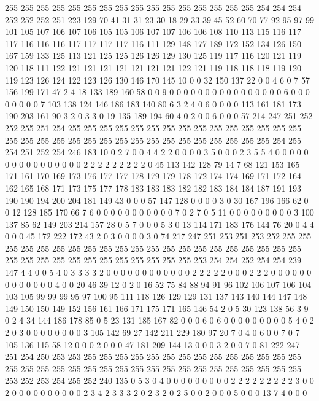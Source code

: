 255 255 255 255 255 255 255 255 255 255 255 255 255 255 255 255 254 254 254 252
252 252 251 223 129 70 41 31 31 23 30 18 29 33 39 45 52 60 70 77
92 95 97 99 101 105 107 106 107 106 105 105 106 107 107 106 106 108 110 113
115 116 117 117 116 116 116 117 117 117 117 116 111 129 148 177 189 172 152 134
126 150 167 159 133 125 113 121 125 125 126 126 129 130 125 119 117 116 120 121
119 120 118 111 122 121 121 121 121 121 121 121 122 121 119 118 118 118 119 120
119 123 126 124 122 123 126 130 146 170 145 10 0 0 32 150 137 22 0 0
4 6 0 7 57 156 199 171 47 2 4 18 133 189 160 58 0 0 9 0
0 0 0 0 0 0 0 0 0 0 0 0 0 0 0 6 0 0 0 0
0 0 0 0 7 103 138 124 146 186 183 140 80 6 3 2 4 0 6 0
0 0 0 113 161 181 173 190 203 161 90 3 2 0 3 3 0 19 135 189
194 60 4 0 2 0 0 6 0 0 0 57 214 247 251 252 252 255 251 254
255 255 255 255 255 255 255 255 255 255 255 255 255 255 255 255 255 255 255 255
255 255 255 255 255 255 255 255 255 255 255 255 254 255 254 251 252 254 246 183
10 0 2 7 0 0 4 4 2 2 0 0 0 0 3 5 0 0 0 2
3 5 5 4 0 0 0 0 0 0 0 0 0 0 0 0 0 0 0 0
2 2 2 2 2 2 2 2 2 0 45 113 142 128 79 14 7 68 121 153
165 171 161 170 169 173 176 177 177 178 179 179 178 172 174 174 169 171 172 164
162 165 168 171 173 175 177 178 183 183 183 182 182 183 184 184 187 191 193 190
190 194 200 204 181 149 43 0 0 0 57 147 128 0 0 0 0 3 0 30
167 196 166 62 0 0 12 128 185 170 66 7 6 0 0 0 0 0 0 0
0 0 0 0 7 0 2 7 0 5 11 0 0 0 0 0 0 0 0 0
3 100 137 85 62 149 203 214 157 28 0 5 7 0 0 0 5 3 0 13
114 171 183 176 144 76 20 0 4 4 0 0 0 45 172 222 172 43 2 0
3 0 0 0 0 3 0 74 217 247 251 253 251 253 252 255 255 255 255 255
255 255 255 255 255 255 255 255 255 255 255 255 255 255 255 255 255 255 255 255
255 255 255 255 255 255 255 255 253 254 254 252 254 254 239 147 4 4 0 0
5 4 0 3 3 3 3 2 0 0 0 0 0 0 0 0 0 0 0 0
2 2 2 2 2 0 0 0 2 2 2 0 0 0 0 0 0 0 0 0
0 0 0 0 4 0 0 20 46 39 12 0 2 0 16 52 75 84 88 94
91 96 102 106 107 106 104 103 105 99 99 99 95 97 100 95 111 118 126 129
129 131 137 143 140 144 147 148 149 150 150 149 152 156 161 166 171 175 171 165
146 54 2 0 5 30 123 138 56 3 9 0 2 4 34 144 186 178 85 0
5 23 131 185 167 82 0 0 0 6 0 6 0 0 0 0 0 0 0 0
0 5 4 0 2 2 0 3 0 0 0 0 0 0 0 0 3 105 142 69
27 142 211 229 180 97 20 7 0 4 0 6 0 0 7 0 7 105 136 115
58 12 0 0 0 2 0 0 0 47 181 209 144 13 0 0 0 3 2 0
0 7 0 81 222 247 251 254 250 253 253 255 255 255 255 255 255 255 255 255
255 255 255 255 255 255 255 255 255 255 255 255 255 255 255 255 255 255 255 255
255 255 255 255 253 252 253 254 255 252 240 135 0 5 3 0 4 0 0 0
0 0 0 0 0 0 2 2 2 2 2 2 2 2 2 3 0 0 2 0
0 0 0 0 0 0 0 0 0 2 3 4 2 3 3 3 2 0 2 3
2 0 2 5 0 0 2 0 0 0 5 0 0 0 13 7 4 0 0 0
